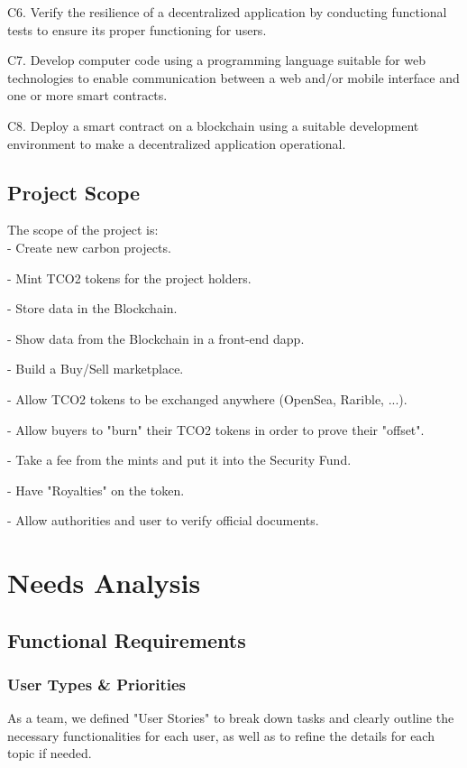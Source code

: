 \documentclass[a4paper, 12pt]{article}
\begin{document}
C6. Verify the resilience of a decentralized application by conducting functional tests to ensure its proper functioning for users.

C7. Develop computer code using a programming language suitable for web technologies to enable communication between a web and/or mobile interface and one or more smart contracts.

C8. Deploy a smart contract on a blockchain using a suitable development environment to make a decentralized application operational.

\subsection{Project Scope}

The scope of the project is:\\

- Create new carbon projects.

- Mint TCO2 tokens for the project holders.

- Store data in the Blockchain.

- Show data from the Blockchain in a front-end dapp.

- Build a Buy/Sell marketplace.

- Allow TCO2 tokens to be exchanged anywhere (OpenSea, Rarible, ...).

- Allow buyers to "burn" their TCO2 tokens in order to prove their "offset".

- Take a fee from the mints and put it into the Security Fund.

- Have "Royalties" on the token.

- Allow authorities and user to verify official documents.


\section{Needs Analysis}

\subsection{Functional Requirements}

\subsubsection{User Types \& Priorities}

As a team, we defined "User Stories" to break down tasks and clearly outline the necessary functionalities for each user, as well as to refine the details for each topic if needed.\\
\end{document}
